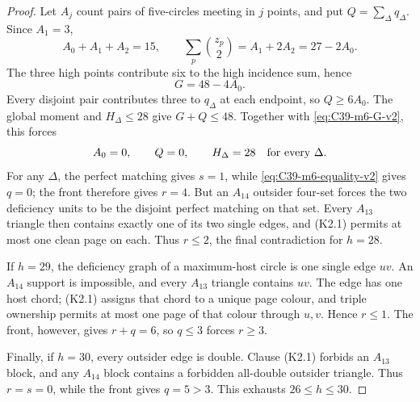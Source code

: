 \begin{proof}
Let \(A_j\) count pairs of five-circles meeting in \(j\) points, and put
\(Q=\sum_\Delta q_\Delta\).  Since \(A_1=3\),
\[
 A_0+A_1+A_2=15,\qquad
 \sum_p\binom{z_p}{2}=A_1+2A_2=27-2A_0.
\]
The three high points contribute six to the high incidence sum, hence
\begin{equation}\label{eq:C39-m6-G-v2}
 G=48-4A_0.
\end{equation}
Every disjoint pair contributes three to \(q_\Delta\) at each endpoint, so
\(Q\ge6A_0\).  The global moment and \(H_\Delta\le28\) give
\(G+Q\le48\).  Together with \eqref{eq:C39-m6-G-v2}, this forces
\begin{equation}\label{eq:C39-m6-equality-v2}
 A_0=0,\qquad Q=0,\qquad H_\Delta=28
 \quad\hbox{for every }\Delta.
\end{equation}
For any \(\Delta\), the perfect matching gives \(s=1\), while
\eqref{eq:C39-m6-equality-v2} gives
\(q=0\); the front therefore gives \(r=4\).  But an \(A_{14}\) outsider
four-set forces the two deficiency units to be the disjoint perfect
matching on that set.  Every \(A_{13}\) triangle then contains exactly one
of its two single edges, and (K2.1) permits at most one clean page on each.
Thus \(r\le2\), the final contradiction for \(h=28\).

If \(h=29\), the deficiency graph of a maximum-host circle is one single
edge \(uv\).  An \(A_{14}\) support is impossible, and every \(A_{13}\)
triangle contains \(uv\).  The edge has one host chord; (K2.1) assigns that
chord to a unique page colour, and triple ownership permits at most one page
of that colour through \(u,v\).  Hence \(r\le1\).  The front, however, gives
\(r+q=6\), so \(q\le3\) forces \(r\ge3\).

Finally, if \(h=30\), every outsider edge is double.  Clause (K2.1) forbids
an \(A_{13}\) block, and any \(A_{14}\) block contains a forbidden
all-double outsider triangle.  Thus \(r=s=0\), while the front gives
\(q=5>3\).  This exhausts \(26\le h\le30\).
\end{proof}
